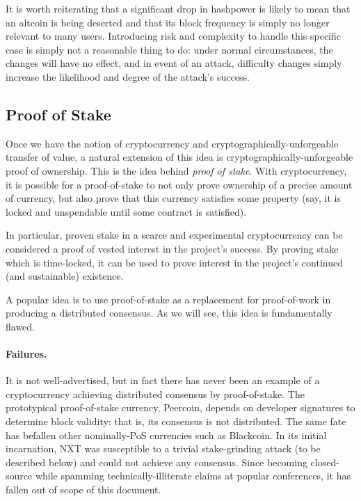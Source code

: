 \documentclass[letterpaper]{article}
\begin{document}
It is worth reiterating that a significant drop in hashpower is likely to mean that
an altcoin is being deserted and that its block frequency is simply no longer relevant
to many users. Introducing risk and complexity to handle this specific case is simply
not a reasonable thing to do: under normal circumstances, the changes will have no
effect, and in event of an attack, difficulty changes simply increase the likelihood
and degree of the attack's success.

\subsection{Proof of Stake\label{secpos}}

Once we have the notion of cryptocurrency and cryptographically-unforgeable
transfer of value, a natural extension of this idea is cryptographically-unforgeable
proof of ownership. This is the idea behind \emph{proof of stake}. With cryptocurrency,
it is possible for a proof-of-stake to not only prove ownership of a precise
amount of currency, but also prove that this currency satisfies some property
(say, it is locked and unspendable until some contract is satisfied).

In particular, proven stake in a scarce and experimental cryptocurrency can be
considered a proof of vested interest in the project's success. By proving stake
which is time-locked, it can be used to prove interest in the project's continued
(and sustainable) existence.

A popular idea is to use proof-of-stake as a replacement for proof-of-work in
producing a distributed consensus. As we will see, this idea is fundamentally
flawed.

\paragraph{Failures.} It is not well-advertised, but in fact there has never
been an example of a cryptocurrency achieving distributed consensus by proof-of-stake.
The prototypical proof-of-stake currency, Peercoin, depends on developer signatures
to determine block validity: that is, its consensus is not distributed. The same
fate has befallen other nominally-PoS currencies such as Blackcoin. In its initial
incarnation, NXT was susceptible to a trivial stake-grinding attack (to be described
below) and could not achieve any consensus. Since becoming closed-source while spamming
technically-illiterate claims at popular conferences, it has fallen out of scope of
this document.
\end{document}

